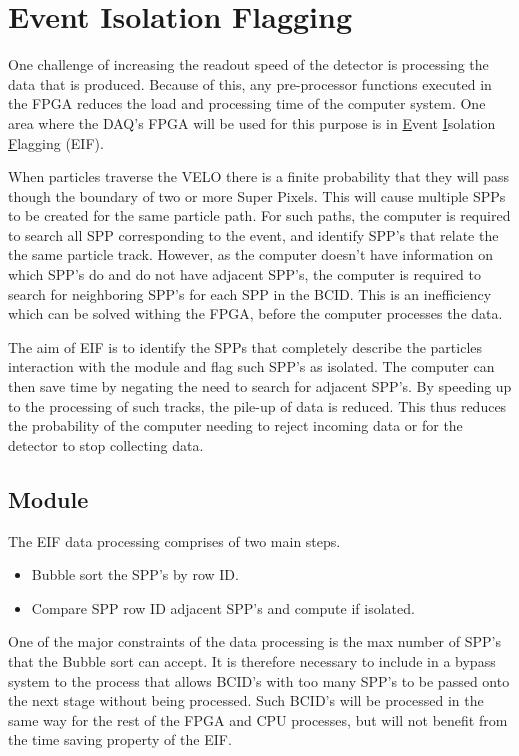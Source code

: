 \section{Event Isolation Flagging}
	
	One challenge of increasing the readout speed of the detector is processing the data that is produced.
	Because of this, any pre-processor functions executed in the FPGA reduces the load and processing time of the computer system.
	One area where the DAQ's FPGA will be used for this purpose is in \underline{E}vent \underline{I}solation \underline{F}lagging (EIF).
	\par
	When particles traverse the VELO there is a finite probability that they will pass though the boundary of two or more Super Pixels.
	This will cause multiple SPPs to be created for the same particle path.
	For such paths, the computer is required to search all SPP corresponding to the event, and identify SPP's that relate the the same particle track. However, as the computer doesn't have information on which SPP's do and do not have adjacent SPP's, the computer is required to search for neighboring SPP's for each SPP in the BCID. This is an inefficiency which can be solved withing the FPGA, before the computer processes the data.
	\par
	The aim of EIF is to identify the SPPs that completely describe the particles interaction with the module and flag such SPP's as isolated.
	The computer can then save time by negating the need to search for adjacent SPP's.
	By speeding up to the processing of such tracks, the pile-up of data is reduced.
	This thus reduces the probability of the computer needing to reject incoming data or for the detector to stop collecting data.

	\subsection{Module} %
	\label{sub:top_level_processing}
	
		The EIF data processing comprises of two main steps.

		\begin{itemize}
			\item Bubble sort the SPP's by row ID.
			\item Compare SPP row ID adjacent SPP's and compute if isolated. 
		\end{itemize}

		One of the major constraints of the data processing is the max number of SPP's that the Bubble sort can accept.
		It is therefore necessary to include in a bypass system to the process that allows BCID's with too many SPP's to be passed onto the next stage without being processed.
		Such BCID's will be processed in the same way for the rest of the FPGA and CPU processes, but will not benefit from the time saving property of the EIF.

